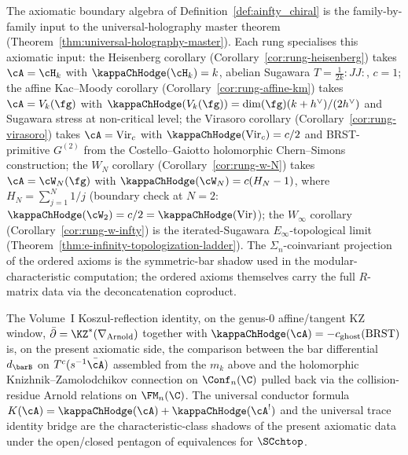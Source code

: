 \begin{remark}
\label{rem:axioms-holography-anchor}%
%
The axiomatic boundary algebra of
Definition~\ref{def:ainfty_chiral} is the family-by-family input
to the universal-holography master theorem
(Theorem~\ref{thm:universal-holography-master}).
Each rung specialises this axiomatic input:
the Heisenberg corollary (Corollary~\ref{cor:rung-heisenberg})
takes $\cA = \cH_k$ with $\kappaChHodge(\cH_k) = k$, abelian Sugawara
$T = \tfrac{1}{2k}{:}JJ{:}$, $c = 1$;
the affine Kac--Moody corollary
(Corollary~\ref{cor:rung-affine-km}) takes $\cA = V_k(\fg)$ with
$\kappaChHodge(V_k(\fg)) = \dim(\fg)(k+h^\vee)/(2h^\vee)$ and Sugawara
stress at non-critical level;
the Virasoro corollary (Corollary~\ref{cor:rung-virasoro})
takes $\cA = \mathrm{Vir}_c$ with
$\kappaChHodge(\mathrm{Vir}_c) = c/2$ and BRST-primitive $G^{(2)}$
from the Costello--Gaiotto holomorphic Chern--Simons construction;
the $W_N$ corollary (Corollary~\ref{cor:rung-w-N}) takes
$\cA = \cW_N(\fg)$ with $\kappaChHodge(\cW_N) = c(H_N - 1)$, where
$H_N = \sum_{j=1}^N 1/j$ (boundary check at $N=2$:
$\kappaChHodge(\cW_2) = c/2 = \kappaChHodge(\mathrm{Vir})$); the
$W_\infty$ corollary (Corollary~\ref{cor:rung-w-infty}) is the
iterated-Sugawara $E_\infty$-topological limit
(Theorem~\ref{thm:e-infinity-topologization-ladder}). The
$\Sigma_n$-coinvariant projection of the ordered axioms is the
symmetric-bar shadow used in the modular-characteristic
computation; the ordered axioms themselves carry the full
$R$-matrix data via the deconcatenation coproduct.

The Volume~I Koszul-reflection identity, on the genus-$0$
affine/tangent KZ window,
$\bar\partial = \KZ^*(\nabla_{\mathrm{Arnold}})$ together with
$\kappaChHodge(\cA) = -c_{\mathrm{ghost}}(\mathrm{BRST})$ is, on the
present axiomatic side, the comparison between the bar
differential $d_{\barB}$ on $T^c(s^{-1}\bar\cA)$ assembled from
the $m_k$ above and the holomorphic Knizhnik--Zamolodchikov
connection on $\Conf_n(\C)$ pulled back via the collision-residue
Arnold relations on $\FM_n(\C)$. The universal conductor formula
$K(\cA) = \kappaChHodge(\cA) + \kappaChHodge(\cA^!)$ and the universal
trace identity bridge are the characteristic-class shadows of
the present axiomatic data under the open/closed pentagon of
equivalences for $\SCchtop$.
\end{remark}

